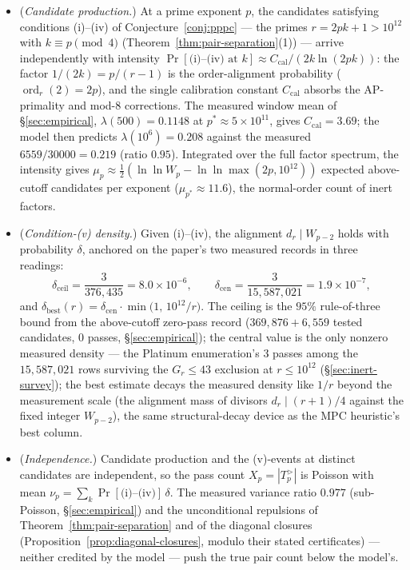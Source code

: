 \documentclass[11pt]{amsart}
\theoremstyle{plain}
\theoremstyle{definition}
\theoremstyle{remark}
\numberwithin{equation}{section}
\newcommand{\ord}{\operatorname{ord}}
\newcommand{\Prob}{\operatorname{Pr}}
\begin{document}
\begin{itemize}
\item[\textbf{M1}] (\emph{Candidate production.}) At a prime exponent
$p$, the candidates satisfying conditions (i)--(iv) of
Conjecture~\ref{conj:pppc} --- the primes $r = 2 p k + 1 > 10^{12}$ with
$k \equiv p \pmod 4$ (Theorem~\ref{thm:pair-separation}(1)) --- arrive
independently with intensity $\Prob[\text{(i)--(iv) at } k] \approx
C_{\mathrm{cal}} / (2 k \ln(2 p k))$: the factor $1/(2k) = p/(r-1)$ is
the order-alignment probability ($\ord_r(2) = 2p$), and the single
calibration constant $C_{\mathrm{cal}}$ absorbs the AP-primality and
mod-$8$ corrections. The measured window mean of \S\ref{sec:empirical},
$\lambda(500) = 0.1148$ at $p^\ast \approx 5 \times 10^{11}$, gives
$C_{\mathrm{cal}} = 3.69$; the model then predicts
$\lambda(10^6) = 0.208$ against the measured $6559/30000 = 0.219$
(ratio $0.95$). Integrated over the full factor spectrum, the intensity
gives $\mu_p \approx \tfrac12(\ln \ln W_p - \ln \ln \max(2p, 10^{12}))$
expected above-cutoff candidates per exponent ($\mu_{p^\ast} \approx
11.6$), the normal-order count of inert factors.
\item[\textbf{M2}] (\emph{Condition-(v) density.}) Given (i)--(iv), the
alignment $d_r \mid W_{p-2}$ holds with probability $\delta$, anchored on
the paper's two measured records in three readings:
\[
  \delta_{\mathrm{ceil}} = \frac{3}{376{,}435} = 8.0 \times 10^{-6},
  \qquad
  \delta_{\mathrm{cen}} = \frac{3}{15{,}587{,}021} = 1.9 \times 10^{-7},
\]
and $\delta_{\mathrm{best}}(r) = \delta_{\mathrm{cen}} \cdot
\min\!\big(1,\, 10^{12}/r\big)$. The ceiling is the $95\%$ rule-of-three
bound from the above-cutoff zero-pass record ($369{,}876 + 6{,}559$
tested candidates, $0$ passes, \S\ref{sec:empirical}); the central value
is the only nonzero measured density --- the Platinum enumeration's $3$
passes among the $15{,}587{,}021$ rows surviving the $G_r \leq 43$
exclusion at $r \leq 10^{12}$ (\S\ref{sec:inert-survey}); the best
estimate decays the measured density like $1/r$ beyond the measurement
scale (the alignment mass of divisors $d_r \mid (r+1)/4$ against the
fixed integer $W_{p-2}$), the same structural-decay device as the MPC
heuristic's best column.
\item[\textbf{M3}] (\emph{Independence.}) Candidate production and the
(v)-events at distinct candidates are independent, so the pass count
$X_p = |T_p^{>}|$ is Poisson with mean $\nu_p = \sum_k
\Prob[\text{(i)--(iv)}]\,\delta$. The measured variance ratio $0.977$
(sub-Poisson, \S\ref{sec:empirical}) and the unconditional repulsions of
Theorem~\ref{thm:pair-separation} and of the diagonal closures
(Proposition~\ref{prop:diagonal-closures}, modulo their stated
certificates) --- neither credited by the model --- push the true pair
count below the model's.
\end{itemize}
\end{document}
